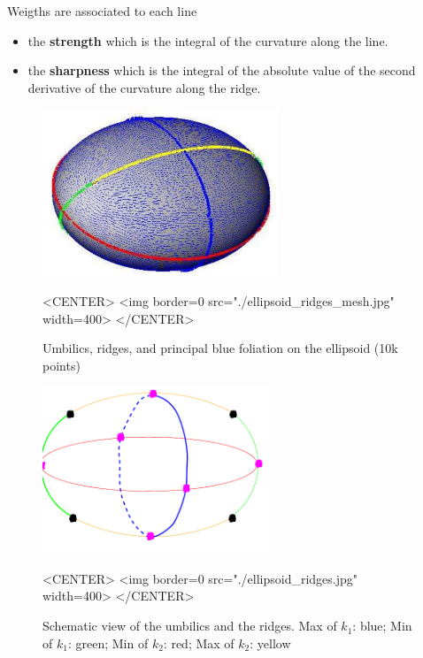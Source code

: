 Weigths are associated to each line
\begin{itemize}
\item
the {\bf strength} which is the integral of the curvature along the
line.
\item
the {\bf sharpness} which is the integral of the absolute value of
the second derivative of the curvature along the ridge.
\end{itemize}


\begin{figure}[!ht] 
\begin{ccTexOnly}
\centerline{ 
\includegraphics[height=5cm]{Ridges_3/ellipsoid_ridges_mesh}}
\end{ccTexOnly}

\begin{ccHtmlOnly}
<CENTER> <img border=0 src="./ellipsoid_ridges_mesh.jpg" width=400>
</CENTER>
\end{ccHtmlOnly}

\caption{Umbilics, ridges, and principal blue foliation on the
ellipsoid (10k points)}
\label{pict:ellipsoid_ridges} 
\end{figure} 
\hfill
\begin{figure}[H] 
\begin{ccTexOnly}
\centerline{ 
\includegraphics[height=5cm]{Ridges_3/ellipsoid_ridges}}
\end{ccTexOnly}

\begin{ccHtmlOnly}
<CENTER> <img border=0 src="./ellipsoid_ridges.jpg" width=400>
</CENTER>
\end{ccHtmlOnly}

\caption{Schematic view of the umbilics and the ridges. Max of $k_1$:
blue; Min of $k_1$: green; Min of $k_2$: red; Max of $k_2$: yellow}
\label{fig:ridges_ellipsoid}
\end{figure} 



